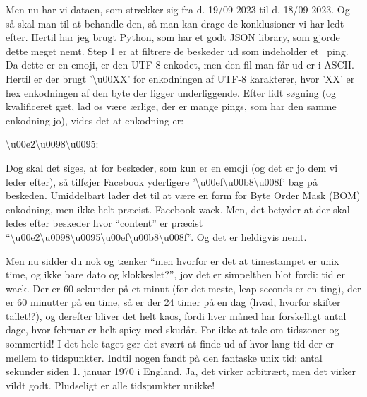 \begin{article}
Men nu har vi dataen, som strækker sig fra d. 19/09-2023 til d. 18/09-2023. Og så skal man til at behandle den, så man kan drage de konklusioner vi har ledt efter. Hertil har jeg brugt Python, som har et godt JSON library, som gjorde dette meget nemt. Step 1 er at filtrere de beskeder ud som indeholder et \coffee\ ping. Da dette er en emoji, er den UTF-8 enkodet, men den fil man får ud er i ASCII. Hertil er der brugt '\textbackslash u00XX' for enkodningen af UTF-8 karakterer, hvor 'XX' er hex enkodningen af den byte der ligger underliggende. Efter lidt søgning (og kvalificeret gæt, lad os være ærlige, der er mange pings, som har den samme enkodning jo), vides det at enkodning er:
\begin{center}
\textbackslash u00e2\textbackslash u0098\textbackslash u0095: \coffee
\end{center}
Dog skal det siges, at for beskeder, som kun er en emoji (og det er jo dem vi leder efter), så tilføjer Facebook yderligere '\textbackslash u00ef\textbackslash u00b8\textbackslash u008f' bag på beskeden. Umiddelbart lader det til at være en form for Byte Order Mask (BOM) enkodning, men ikke helt præcist. Facebook wack. Men, det betyder at der skal ledes efter beskeder hvor ``content'' er præcist ``\textbackslash u00e2\textbackslash u0098\textbackslash u0095\textbackslash u00ef\textbackslash u00b8\textbackslash u008f''. Og det er heldigvis nemt.

Men nu sidder du nok og tænker ``men hvorfor er det at timestampet er unix time, og ikke bare dato og klokkeslet?'', jov det er simpelthen blot fordi: tid er wack. Der er 60 sekunder på et minut (for det meste, leap-seconds er en ting), der er 60 minutter på en time, så er der 24 timer på en dag (hvad, hvorfor skifter tallet!?), og derefter bliver det helt kaos, fordi hver måned har forskelligt antal dage, hvor februar er helt spicy med skudår. For ikke at tale om tidszoner og sommertid! I det hele taget gør det svært at finde ud af hvor lang tid der er mellem to tidspunkter. Indtil nogen fandt på den fantaske unix tid: antal sekunder siden 1. januar 1970 i England. Ja, det virker arbitrært, men det virker vildt godt. Pludseligt er alle tidspunkter unikke!


\end{article}
